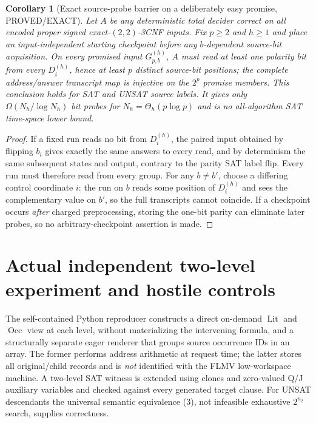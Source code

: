 \documentclass[11pt]{article}
\newtheorem{corollary}[theorem]{Corollary}
\begin{document}
\begin{corollary}[Exact source-probe barrier on a deliberately easy promise, PROVED/EXACT]
Let $A$ be any deterministic total decider correct on all encoded proper signed exact-$(2,2)$-3CNF inputs. Fix $p\ge2$ and $h\ge1$ and place an input-independent starting checkpoint \emph{before any $b$-dependent source-bit acquisition}. On every promised input $G^{(h)}_{p,b}$, $A$ must read at least one polarity bit from every $D_i^{(h)}$, hence at least $p$ \emph{distinct} source-bit positions; the complete address/answer transcript map is injective on the $2^p$ promise members. This conclusion holds for SAT and UNSAT source labels. It gives only $\Omega(N_h/\log N_h)$ bit probes for $N_h=\Theta_h(p\log p)$ and is no all-algorithm SAT time-space lower bound.
\end{corollary}
\begin{proof}
If a fixed run reads no bit from $D_i^{(h)}$, the paired input obtained by flipping $b_i$ gives exactly the same answers to every read, and by determinism the same subsequent states and output, contrary to the parity SAT label flip. Every run must therefore read from every group. For any $b\ne b'$, choose a differing control coordinate $i$: the run on $b$ reads some position of $D_i^{(h)}$ and sees the complementary value on $b'$, so the full transcripts cannot coincide. If a checkpoint occurs \emph{after} charged preprocessing, storing the one-bit parity can eliminate later probes, so no arbitrary-checkpoint assertion is made.
\end{proof}

\section{Actual independent two-level experiment and hostile controls}
The self-contained Python reproducer constructs a direct on-demand $\operatorname{Lit}$ and $\operatorname{Occ}$ view at each level, without materializing the intervening formula, and a structurally separate eager renderer that groups source occurrence IDs in an array. The former performs address arithmetic at request time; the latter stores all original/child records and is \emph{not} identified with the FLMV low-workspace machine. A two-level SAT witness is extended using clones and zero-valued Q/J auxiliary variables and checked against every generated target clause. For UNSAT descendants the universal semantic equivalence (3), not infeasible exhaustive $2^{n_2}$ search, supplies correctness.
\end{document}
